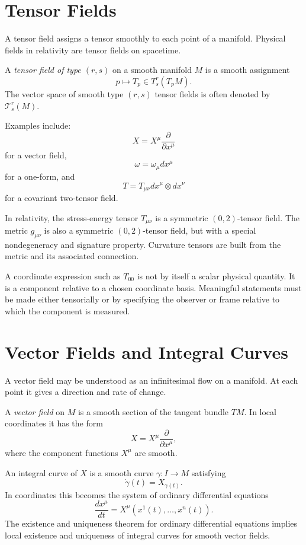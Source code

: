 \clearpage

\section{Tensor Fields}

A tensor field assigns a tensor smoothly to each point of a manifold. Physical
fields in relativity are tensor fields on spacetime.

\begin{definitionbox}
A \emph{tensor field of type \((r,s)\)} on a smooth manifold \(M\) is a smooth
assignment
\[
p\mapsto T_p\in T^r_s(T_pM).
\]
The vector space of smooth type \((r,s)\) tensor fields is often denoted by
\(\mathcal{T}^r_s(M)\).
\end{definitionbox}

Examples include:
\[
X=X^\mu\frac{\partial}{\partial x^\mu}
\]
for a vector field,
\[
\omega=\omega_\mu dx^\mu
\]
for a one-form, and
\[
T=T_{\mu\nu}dx^\mu\otimes dx^\nu
\]
for a covariant two-tensor field.

In relativity, the stress-energy tensor \(T_{\mu\nu}\) is a symmetric
\((0,2)\)-tensor field. The metric \(g_{\mu\nu}\) is also a symmetric
\((0,2)\)-tensor field, but with a special nondegeneracy and signature property.
Curvature tensors are built from the metric and its associated connection.

A coordinate expression such as \(T_{00}\) is not by itself a scalar physical
quantity. It is a component relative to a chosen coordinate basis. Meaningful
statements must be made either tensorially or by specifying the observer or
frame relative to which the component is measured.

\clearpage

\section{Vector Fields and Integral Curves}

A vector field may be understood as an infinitesimal flow on a manifold. At each
point it gives a direction and rate of change.

\begin{definitionbox}
A \emph{vector field} on \(M\) is a smooth section of the tangent bundle
\(TM\). In local coordinates it has the form
\[
X=X^\mu\frac{\partial}{\partial x^\mu},
\]
where the component functions \(X^\mu\) are smooth.
\end{definitionbox}

An integral curve of \(X\) is a smooth curve \(\gamma:I\to M\) satisfying
\[
\dot{\gamma}(t)=X_{\gamma(t)}.
\]
In coordinates this becomes the system of ordinary differential equations
\[
\frac{dx^\mu}{dt}=X^\mu(x^1(t),\ldots,x^n(t)).
\]
The existence and uniqueness theorem for ordinary differential equations implies
local existence and uniqueness of integral curves for smooth vector fields.

